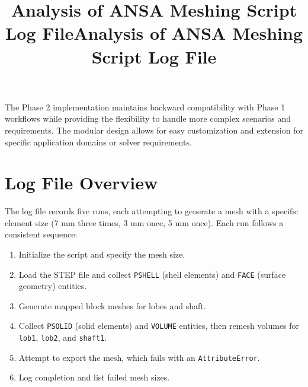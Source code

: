 \documentclass{book}
\begin{document}
\begin{itemize}[leftmargin=*,label=\textbullet]
The Phase 2 implementation maintains backward compatibility with Phase 1 workflows while providing the flexibility to handle more complex scenarios and requirements. The modular design allows for easy customization and extension for specific application domains or solver requirements.




        




\title{Analysis of ANSA Meshing Script Log File}

\title{Analysis of ANSA Meshing Script Log File}

\section{Log File Overview}
The log file records five runs, each attempting to generate a mesh with a specific element size (7 mm three times, 3 mm once, 5 mm once). Each run follows a consistent sequence:
\begin{enumerate}
    \item Initialize the script and specify the mesh size.
    \item Load the STEP file and collect \texttt{PSHELL} (shell elements) and \texttt{FACE} (surface geometry) entities.
    \item Generate mapped block meshes for lobes and shaft.
    \item Collect \texttt{PSOLID} (solid elements) and \texttt{VOLUME} entities, then remesh volumes for \texttt{lob1}, \texttt{lob2}, and \texttt{shaft1}.
    \item Attempt to export the mesh, which fails with an \texttt{AttributeError}.
    \item Log completion and list failed mesh sizes.
\end{enumerate}


\end{itemize}
\end{document}
